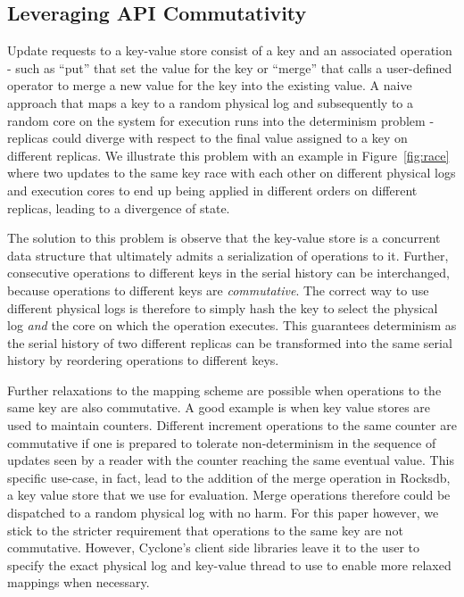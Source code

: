 \documentclass[10pt, preprint, nonatbib]{sigplanconf}
\begin{document}
\subsection{Leveraging API Commutativity}
Update requests to a key-value store consist of a key and an associated operation -
such as ``put'' that set the value for the key or ``merge'' that calls a
user-defined operator to merge a new value for the key into the existing value.
A naive approach that maps a key to a random physical log and subsequently to a
random core on the system for execution runs into the determinism problem -
replicas could diverge with respect to the final value assigned to a key on
different replicas. We illustrate this problem with an example in
Figure~\ref{fig:race} where two updates to the same key race with each other on
different physical logs and execution cores to end up being applied in different
orders on different replicas, leading to a divergence of state.

The solution to this problem is observe that the key-value store is a concurrent
data structure that ultimately admits a serialization of operations to
it. Further, consecutive operations to different keys in the serial history can
be interchanged, because operations to different keys are
\emph{commutative}. The correct way to use different physical logs is therefore
to simply hash the key to select the physical log \emph{and} the core on which
the operation executes. This guarantees determinism as the serial history of
two different replicas can be transformed into the same serial history by
reordering operations to different keys. 

Further relaxations to the mapping scheme are possible when operations to the
same key are also commutative. A good example is when key value stores are used
to maintain counters. Different increment operations to the same counter are
commutative if one is prepared to tolerate non-determinism in the sequence of
updates seen by a reader with the counter reaching the same eventual value. This
specific use-case, in fact, lead to the addition of the merge operation in
Rocksdb, a key value store that we use for evaluation. Merge operations
therefore could be dispatched to a random physical log with no harm. For this
paper however, we stick to the stricter requirement that operations to the same
key are not commutative. However, Cyclone's client side libraries leave it to
the user to specify the exact physical log and key-value thread to use to enable
more relaxed mappings when necessary.
\end{document}
